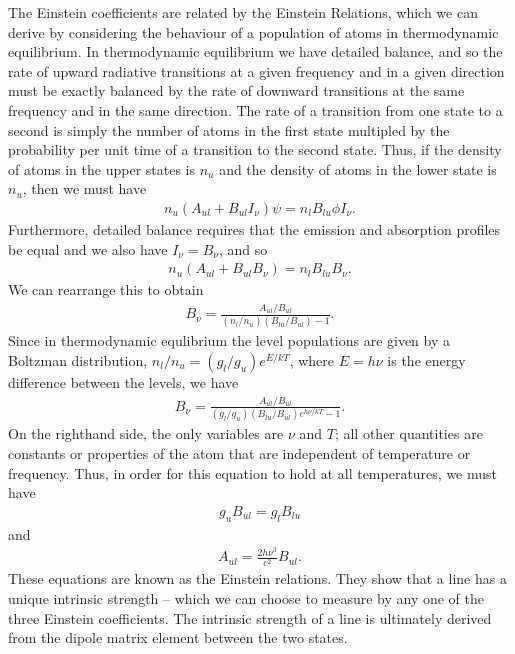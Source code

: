 The Einstein coefficients are related by the Einstein
Relations, which we can derive by considering the behaviour
of a population of atoms in thermodynamic equilibrium. In
thermodynamic equilibrium we have detailed balance, and so
the rate of upward radiative transitions at a given
frequency and in a given direction must be exactly balanced
by the rate of downward transitions at the same frequency
and in the same direction. The rate of a transition from one
state to a second is simply the number of atoms in the first
state multipled by the probability per unit time of a
transition to the second state. Thus, if the density of
atoms in the upper  states is $n_u$ and the density of
atoms in the lower state is $n_u$, then we must have
\begin{align}
n_u(A_{ul} + B_{ul}I_\nu)\psi 
=
n_l B_{lu}\phi I_\nu.
\end{align}
Furthermore, detailed balance requires that the emission and
absorption profiles be equal and we also have $I_\nu =
B_\nu$, and so
\begin{align}
n_u(A_{ul} + B_{ul} B_\nu)
=
n_l B_{lu}B_\nu.
\end{align}
We can rearrange this to obtain 
\begin{align}
B_\nu = \frac{A_{ul}/B_{ul}}{(n_l/n_u)(B_{lu}/B_{ul}) - 1}.
\end{align}
Since in thermodynamic equlibrium the level populations are
given by a Boltzman distribution, $n_l/n_u = (g_l/g_u)
e^{E/kT}$, where $E = h\nu$ is the energy difference between
the levels, we have
\begin{align}
B_\nu = \frac{A_{ul}/B_{ul}}{(g_l/g_u)
(B_{lu}/B_{ul})e^{h\nu/kT} - 1}.
\end{align}
On the righthand side, the only variables are $\nu$ and $T$;
all other quantities are constants or properties of the atom
that are independent of temperature or frequency. Thus, in
order for this equation to hold at all temperatures, we must
have
\begin{align}
g_u B_{ul} = g_l B_{lu}
\end{align} 
and 
\begin{align}
A_{ul} = \frac{2h\nu^3}{c^2} B_{ul}.
\end{align}
These equations are known as the Einstein relations. They
show that a line has a unique intrinsic strength -- which we
can choose to measure by any one of the three Einstein
coefficients. The intrinsic strength of a line is ultimately
derived from the dipole matrix element between the two
states.

